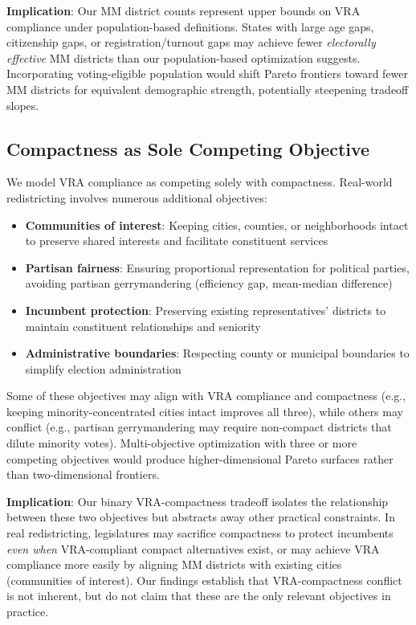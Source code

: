 \textbf{Implication}: Our MM district counts represent upper bounds on VRA compliance under population-based definitions. States with large age gaps, citizenship gaps, or registration/turnout gaps may achieve fewer \emph{electorally effective} MM districts than our population-based optimization suggests. Incorporating voting-eligible population would shift Pareto frontiers toward fewer MM districts for equivalent demographic strength, potentially steepening tradeoff slopes.

\subsection{Compactness as Sole Competing Objective}

We model VRA compliance as competing solely with compactness. Real-world redistricting involves numerous additional objectives:
\begin{itemize}
    \item \textbf{Communities of interest}: Keeping cities, counties, or neighborhoods intact to preserve shared interests and facilitate constituent services
    \item \textbf{Partisan fairness}: Ensuring proportional representation for political parties, avoiding partisan gerrymandering (efficiency gap, mean-median difference)
    \item \textbf{Incumbent protection}: Preserving existing representatives' districts to maintain constituent relationships and seniority
    \item \textbf{Administrative boundaries}: Respecting county or municipal boundaries to simplify election administration
\end{itemize}

Some of these objectives may align with VRA compliance and compactness (e.g., keeping minority-concentrated cities intact improves all three), while others may conflict (e.g., partisan gerrymandering may require non-compact districts that dilute minority votes). Multi-objective optimization with three or more competing objectives would produce higher-dimensional Pareto surfaces rather than two-dimensional frontiers.

\textbf{Implication}: Our binary VRA-compactness tradeoff isolates the relationship between these two objectives but abstracts away other practical constraints. In real redistricting, legislatures may sacrifice compactness to protect incumbents \emph{even when} VRA-compliant compact alternatives exist, or may achieve VRA compliance more easily by aligning MM districts with existing cities (communities of interest). Our findings establish that VRA-compactness conflict is not inherent, but do not claim that these are the only relevant objectives in practice.

